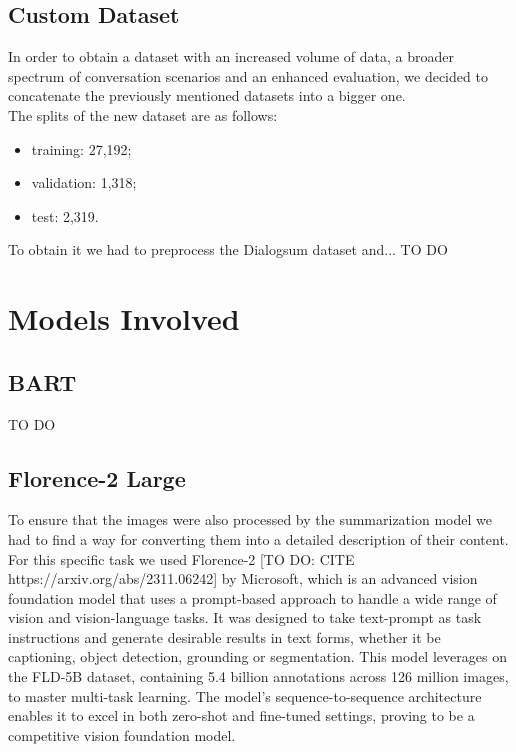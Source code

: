 \documentclass[10pt,twocolumn,letterpaper]{article}
\begin{document}
\subsection{Custom Dataset}

In order to obtain a dataset with an increased volume of data, a broader spectrum of conversation scenarios and an enhanced evaluation, we decided to concatenate the previously mentioned datasets into a bigger one. \\
The splits of the new dataset are as follows:
\begin{itemize}
    \item training: 27,192;
    \item validation: 1,318;
    \item test: 2,319.
\end{itemize}

To obtain it we had to preprocess the Dialogsum dataset and... TO DO

\section{Models Involved}

\subsection{BART}

TO DO

\subsection{Florence-2 Large}

To ensure that the images were also processed by the summarization model we had to find a way for converting them into a detailed description of their content. For this specific task we used Florence-2 [TO DO: CITE https://arxiv.org/abs/2311.06242] by Microsoft, which is an advanced vision foundation model that uses a prompt-based approach to handle a wide range of vision and vision-language tasks. It was designed to take text-prompt as task instructions and generate desirable results in text forms, whether it be captioning, object detection, grounding or segmentation. This model leverages on the FLD-5B dataset, containing 5.4 billion annotations across 126 million images, to master multi-task learning. The model's sequence-to-sequence architecture enables it to excel in both zero-shot and fine-tuned settings, proving to be a competitive vision foundation model.
\end{document}
